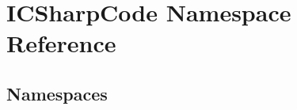 \hypertarget{namespace_i_c_sharp_code}{}\section{I\+C\+Sharp\+Code Namespace Reference}
\label{namespace_i_c_sharp_code}
\subsection*{Namespaces}
\begin{DoxyCompactItemize}
\end{DoxyCompactItemize}
